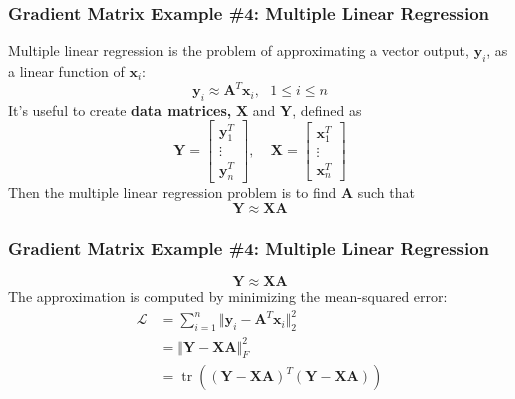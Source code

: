 \documentclass{beamer}
\DeclareMathOperator{\tr}{tr}
\begin{document}
\begin{frame}
  \frametitle{Gradient Matrix Example \#4: Multiple Linear Regression}
  Multiple linear regression is the problem of approximating a vector
  output, $\mathbf{y}_i$, as a linear function of $\mathbf{x}_i$:
  \begin{displaymath}
    \mathbf{y}_i\approx \mathbf{A}^T\mathbf{x}_i,~~~1\le i\le n
  \end{displaymath}
  It's useful to create {\bf data matrices,} $\mathbf{X}$ and
  $\mathbf{Y}$, defined as
  \begin{displaymath}
    \mathbf{Y}=\left[\begin{array}{c}\mathbf{y}_1^T\\\vdots\\\mathbf{y}_n^T\end{array}\right],~~~~~
    \mathbf{X}=\left[\begin{array}{c}\mathbf{x}_1^T\\\vdots\\\mathbf{x}_n^T\end{array}\right]
  \end{displaymath}
  Then the multiple linear regression problem is to find $\mathbf{A}$
  such that
  \begin{displaymath}
    \mathbf{Y}\approx\mathbf{X}\mathbf{A}
  \end{displaymath}
  
\end{frame}


\begin{frame}
  \frametitle{Gradient Matrix Example \#4: Multiple Linear Regression}
  
  \begin{displaymath}
    \mathbf{Y}\approx\mathbf{X}\mathbf{A}
  \end{displaymath}
  The approximation is computed by minimizing the mean-squared error:
  \begin{align*}
    {\mathcal{L}}&=\sum_{i=1}^n \Vert\mathbf{y}_i-\mathbf{A}^T\mathbf{x}_i\Vert_2^2\\
    &= \Vert\mathbf{Y}-\mathbf{X}\mathbf{A}\Vert_F^2\\
    &= \tr\left((\mathbf{Y}-\mathbf{X}\mathbf{A})^T(\mathbf{Y}-\mathbf{X}\mathbf{A})\right)
  \end{align*}
\end{frame}
\end{document}
